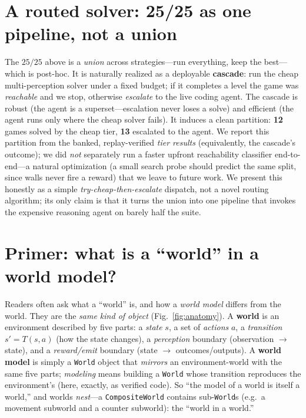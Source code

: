 \documentclass[11pt]{article}
\begin{document}
\section{A routed solver: 25/25 as one pipeline, not a union}
\label{sec:router}
The $25/25$ above is a \emph{union} across strategies---run everything, keep the best---which is
post-hoc. It is naturally realized as a deployable \textbf{cascade}: run the cheap multi-perception
solver under a fixed budget; if it completes a level the game was \emph{reachable} and we stop,
otherwise \emph{escalate} to the live coding agent. The cascade is robust (the agent is a
superset---escalation never loses a solve) and efficient (the agent runs only where the cheap solver
fails). It induces a clean partition: \textbf{12} games solved by the cheap tier, \textbf{13}
escalated to the agent. We report this partition from the banked, replay-verified \emph{tier results}
(equivalently, the cascade's outcome); we did \emph{not} separately run a faster upfront reachability
classifier end-to-end---a natural optimization (a small search probe should predict the same split,
since walls never fire a reward) that we leave to future work. We present this honestly as a simple
\emph{try-cheap-then-escalate} dispatch, not a novel routing algorithm; its only claim is that it
turns the union into one pipeline that invokes the expensive reasoning agent on barely half the suite.

\section{Primer: what is a ``world'' in a world model?}
\label{app:primer}
Readers often ask what a ``world'' is, and how a \emph{world model} differs from the world. They are
the \emph{same kind of object} (Fig.~\ref{fig:anatomy}). A \textbf{world} is an environment described
by five parts: a \emph{state} $s$, a set of \emph{actions} $a$, a \emph{transition} $s'=T(s,a)$ (how
the state changes), a \emph{perception} boundary (observation $\to$ state), and a \emph{reward/emit}
boundary (state $\to$ outcomes/outputs). A \textbf{world model} is simply a \texttt{World} object that
\emph{mirrors} an environment-world with the same five parts; \emph{modeling} means building a
\texttt{World} whose transition reproduces the environment's (here, exactly, as verified code). So
``the model of a world is itself a world,'' and worlds \emph{nest}---a \texttt{CompositeWorld} contains
sub-\texttt{World}s (e.g.\ a movement subworld and a counter subworld): the ``world in a world.''
\end{document}

